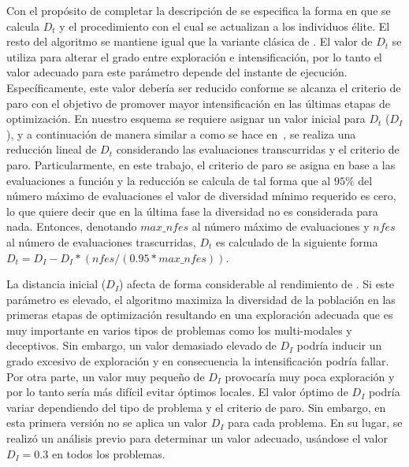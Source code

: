 Con el propósito de completar la descripción de \DEEDM{} se especifica la forma en que se calcula $D_t$ y el procedimiento con el cual se actualizan a los individuos élite.
%
El resto del algoritmo se mantiene igual que la variante clásica de \DE{}.
%
El valor de $D_t$ se utiliza para alterar el grado entre exploración e intensificación, por lo tanto el valor adecuado para este parámetro depende del
instante de ejecución.
%
Específicamente, este valor debería ser reducido conforme se alcanza el criterio de paro con el objetivo de promover mayor intensificación 
en las últimas etapas de optimización.
%
En nuestro esquema se requiere asignar un valor inicial para $D_t$ ($D_I$), y a continuación de manera similar a como se hace en~\cite{segura2016novel}, 
se realiza una reducción lineal de $D_t$ considerando las evaluaciones transcurridas y el criterio de paro.
%
Particularmente, en este trabajo, el criterio de paro se asigna en base a las evaluaciones a función
y la reducción se calcula de tal forma que al $95\%$ del número máximo de evaluaciones el valor de diversidad mínimo requerido es cero,
lo que quiere decir que en la última fase la diversidad no es considerada para nada.
%
Entonces, denotando $max\_nfes$ al número máximo de evaluaciones y $nfes$ al número de evaluaciones trascurridas, $D_t$ es calculado de la siguiente 
forma $D_t=D_I - D_I *(nfes/(0.95*max\_nfes))$.

La distancia inicial ($D_I$) afecta de forma considerable al rendimiento de \DEEDM{}.
%
Si este parámetro es elevado, el algoritmo maximiza la diversidad de la población en las primeras etapas de optimización resultando en una exploración adecuada 
que es muy importante en varios tipos de problemas como los multi-modales y deceptivos.
%
Sin embargo, un valor demasiado elevado de $D_I$ podría inducir un grado excesivo de exploración y en consecuencia la intensificación podría fallar.
%
Por otra parte, un valor muy pequeño de $D_I$ provocaría muy poca exploración y por lo tanto sería más difícil evitar óptimos locales.
%
El valor óptimo de $D_I$ podría variar dependiendo del tipo de problema y el criterio de paro. %
%
Sin embargo, en esta primera versión no se aplica un valor $D_I$ para cada problema.
%
En su lugar, se realizó un análisis previo para determinar un valor adecuado, usándose el valor $D_I = 0.3$ en todos los 
problemas.

